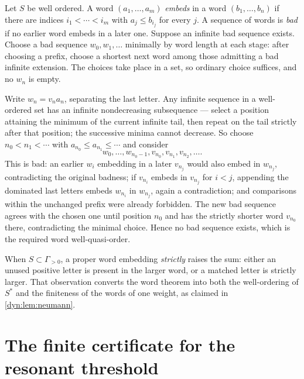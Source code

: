 \documentclass[11pt,letterpaper]{article}
\theoremstyle{definition}
\theoremstyle{remark}
\numberwithin{equation}{section}
\begin{document}
Let $S$ be well ordered. A word $(a_1,\dots,a_m)$ \emph{embeds} in a word
$(b_1,\dots,b_n)$ if there are indices $i_1<\cdots<i_m$ with
$a_j\le b_{i_j}$ for every $j$. A sequence of words is \emph{bad} if no
earlier word embeds in a later one. Suppose an infinite bad sequence
exists. Choose a bad sequence $w_0,w_1,\dots$ minimally by word length at
each stage: after choosing a prefix, choose a shortest next word among
those admitting a bad infinite extension. The choices take place in a set,
so ordinary choice suffices, and no $w_n$ is empty.

Write $w_n=v_na_n$, separating the last letter. Any infinite sequence in a
well-ordered set has an infinite nondecreasing subsequence --- select a
position attaining the minimum of the current infinite tail, then repeat on
the tail strictly after that position; the successive minima cannot
decrease. So choose $n_0<n_1<\cdots$ with
$a_{n_0}\le a_{n_1}\le\cdots$ and consider
\[
 w_0,\dots,w_{n_0-1},v_{n_0},v_{n_1},v_{n_2},\dots .
\]
This is bad: an earlier $w_i$ embedding in a later $v_{n_j}$ would also
embed in $w_{n_j}$, contradicting the original badness; if $v_{n_i}$ embeds
in $v_{n_j}$ for $i<j$, appending the dominated last letters embeds
$w_{n_i}$ in $w_{n_j}$, again a contradiction; and comparisons within the
unchanged prefix were already forbidden. The new bad sequence agrees with
the chosen one until position $n_0$ and has the strictly shorter word
$v_{n_0}$ there, contradicting the minimal choice. Hence no bad sequence
exists, which is the required word well-quasi-order.

When $S\subset\Gamma_{>0}$, a proper word embedding \emph{strictly} raises
the sum: either an unused positive letter is present in the larger word, or
a matched letter is strictly larger. That observation converts the word
theorem into both the well-ordering of $S^{*}$ and the finiteness of the
words of one weight, as claimed in \cref{dyn:lem:neumann}.

\section{The finite certificate for the resonant threshold}
\label{dyn:app:certificate}
\end{document}

